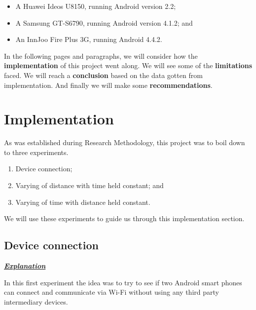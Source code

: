 \documentclass[12pt,svgnames,smaller]{article} %
\begin{document}
	\begin{itemize}
		\item A Huawei Ideos U8150, running Android version 2.2;
		\item A Samsung GT-S6790, running Android version 4.1.2; and 
		\item An InnJoo Fire Plus 3G, running Android 4.4.2. 
	\end{itemize}
	
	In the following pages and paragraphs, we will consider how the \textbf{implementation} of this project went along. We will see some of the \textbf{limitations} faced. We will reach a \textbf{conclusion} based on the data gotten from implementation. And finally we will make some \textbf{recommendations}.
	
	
	
	\section{\textbf{Implementation} } 
	
	As was established during Research Methodology, this project was to boil down to three experiments.
	
	\begin{enumerate}
		\item Device connection;
		\item Varying of distance with time held constant; and 
		\item Varying of time with distance held constant.
	\end{enumerate}
	
	We will use these experiments to guide us through this implementation section.
	
	\subsection{\textbf{Device connection}}
	
	\textbf{\textit{\underline{Explanation}}}
	
	In this first experiment the idea was to try to see if two Android smart phones can connect and communicate via Wi-Fi without using any third party intermediary devices.
	
\end{document}
